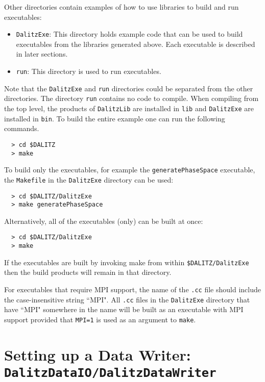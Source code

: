 \documentclass[11pt]{article}
\begin{document}
Other directories contain examples of how to use libraries to build and run executables:
\begin{itemize}
\item {\tt DalitzExe}:  This directory holds example code that can be used to build executables from the libraries generated above.  Each executable is described in later sections.
\item {\tt run}:  This directory is used to run executables.
\end{itemize}

Note that the {\tt DalitzExe} and {\tt run} directories could be separated from the other directories.  The directory {\tt run} contains no code to compile.  When compiling from the top level, the products of {\tt DalitzLib} are installed in {\tt lib} and {\tt DalitzExe} are installed in {\tt bin}.  To build the entire example one can run the following commands.

\begin{verbatim}
  > cd $DALITZ
  > make
\end{verbatim}

To build only the executables, for example the {\tt generatePhaseSpace} executable, the {\tt Makefile} in the {\tt DalitzExe} directory can be used:
\begin{verbatim}
  > cd $DALITZ/DalitzExe
  > make generatePhaseSpace
\end{verbatim}

Alternatively, all of the executables (only) can be built at once:
\begin{verbatim}
  > cd $DALITZ/DalitzExe
  > make
\end{verbatim}

If the executables are built by invoking make from within {\tt \$DALITZ/DalitzExe} then the build products will remain in that directory.

For executables that require MPI support, the name of the {\tt *.cc} file should include the case-insensitive string ``MPI".  All {\tt *.cc} files in the {\tt DalitzExe} directory that have ``MPI" somewhere in the name will be built as an executable with MPI support provided that {\tt MPI=1} is used as an argument to {\tt make}.

\section{Setting up a Data Writer: \\ 
{\tt DalitzDataIO/DalitzDataWriter}}
\label{sec:dw}
\end{document}
